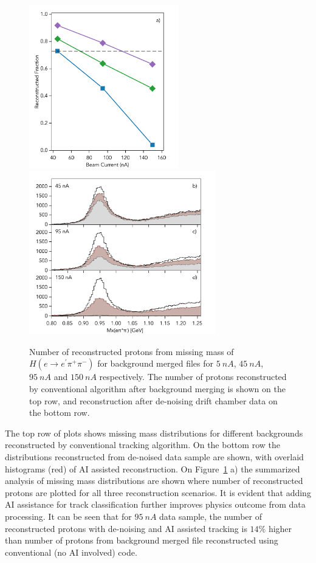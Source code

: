 \begin{figure}[!h]
\begin{center}
 \includegraphics[height=2.8in]{images/graph_mxepipi_dn_ai.pdf}
 \includegraphics[height=2.8in]{images/plots_mxepipi_dn_ai.pdf}
\caption {Number of reconstructed protons from missing mass of $H(e \rightarrow e^\prime \pi^+\pi^-)$ for background 
merged files for  $5~nA$, $45~nA$, $95~nA$ and $150~nA$ respectively. The number of protons reconstructed by 
conventional algorithm after background merging is shown on the top row, and reconstruction after  de-noising drift 
chamber data on the bottom row.}
 \label{physics::conv_dn_ai}
 \end{center}
\end{figure}

The top row of plots shows missing mass distributions for different backgrounds reconstructed by conventional tracking algorithm. On the bottom row the distributions reconstructed from de-noised data sample are shown, with overlaid histograms (red) of AI assisted reconstruction. On Figure~\ref{physics::conv_dn_ai} a) the summarized analysis of missing mass distributions are shown where number of reconstructed protons are plotted for all three reconstruction scenarios. It is evident that adding AI assistance for track classification further improves physics outcome from data processing. It can be seen that for $95~nA$ data sample, the number of reconstructed protons with de-noising and AI assisted tracking is $14\%$ higher than number of protons from background merged file reconstructed using conventional (no AI involved) code.

